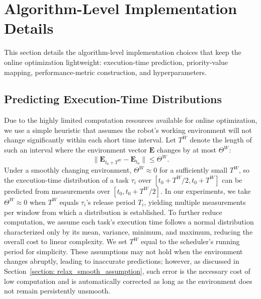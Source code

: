 \section{Algorithm-Level Implementation Details}
\label{section_implementation}

    This section details the algorithm-level implementation choices that keep the online optimization lightweight: execution-time prediction, priority-value mapping, performance-metric construction, and hyperparameters.

    \subsection{Predicting Execution-Time Distributions}
    \label{section: predict_ET_exp}
    Due to the highly limited computation resources available for online optimization, we use a simple heuristic that assumes the robot's working environment will not change significantly within each short time interval.
    Let $T^W$ denote the length of such an interval where the environment vector $\textbf{E}$ changes by at most $\Theta^W$:
    \begin{equation}
        \|\textbf{E}_{t_0+T^W} - \textbf{E}_{t_0} \| \leq \Theta^W.
    \end{equation}
    Under a smoothly changing environment, $\Theta^W \approx 0$ for a sufficiently small $T^W$, so the execution-time distribution of a task $\tau_i$ over $[t_0 + T^W/2, t_0 + T^W]$ can be predicted from measurements over $[t_0, t_0 + T^W/2]$.
    In our experiments, we take $\Theta^W \approx 0$ when $T^W$ equals $\tau_i$'s release period $T_i$, yielding multiple measurements per window from which a distribution is established.
    To further reduce computation, we assume each task's execution time follows a normal distribution characterized only by its mean, variance, minimum, and maximum, reducing the overall cost to linear complexity.
    We set $T^W$ equal to the scheduler's running period for simplicity.
    These assumptions may not hold when the environment changes abruptly, leading to inaccurate predictions; however, as discussed in Section~\ref{section: relax_smooth_assumption}, such error is the necessary cost of low computation and is automatically corrected as long as the environment does not remain persistently unsmooth.


